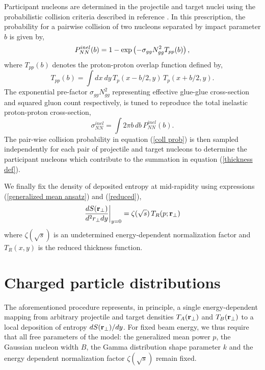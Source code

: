 \documentclass[aps,prl,reprint,amsmath,nofootinbib]{revtex4-1}
\begin{document}
Participant nucleons are determined in the projectile and target nuclei using the probabilistic collision criteria described in reference \cite{proton-proton}. In this prescription, the 
probability for a pairwise collision of two nucleons separated by impact parameter $b$ is given by,
\begin{equation}
  \label{coll prob}
  P^{inel}_{NN}(b) = 1 - \exp \left(-\sigma_{gg} N_{gg}^2 T_{pp}(b) \right), \\[1ex]
\end{equation}
where $T_{pp}(b)$ denotes the proton-proton overlap function defined by,
\begin{equation}
 T_{pp}(b) = \int dx~dy \,T_p(x-b/2,y) \,T_p(x+b/2,y).
\end{equation}
The exponential pre-factor $\sigma_{gg} N_{gg}^2$ representing effective glue-glue cross-section and squared gluon count respectively, is tuned to reproduce the total 
inelastic proton-proton cross-section,
\begin{equation}
  \sigma^{inel}_{NN} = \int 2 \pi b \,db \, P_{NN}^{inel}(b).
\end{equation}
The pair-wise collision probability in equation (\ref{coll prob}) is then sampled independently for each pair of projectile and target nucleons to determine the participant nucleons 
which contribute to the summation in equation (\ref{thickness def}).

We finally fix the density of deposited entropy at mid-rapidity using expressions (\ref{generalized mean ansatz}) and (\ref{reduced}),
\begin{equation}
 \label{entropy deposition}
 \frac{dS({\bf r}_\perp)}{d^2r_\perp dy} \biggr \rvert_{y=0} = \zeta(\sqrt{s})\, T_R(p;{\bf r}_\perp)
\end{equation}
where $\zeta(\sqrt{s})$ is an undetermined energy-dependent normalization factor and $T_R(x,y)$ is the reduced thickness function.

\section{Charged particle distributions}

The aforementioned procedure represents, in principle, a single energy-dependent mapping from arbitrary projectile and target densities $T_A ({\bf r}_\perp)$ and 
$T_B({\bf r}_\perp)$ to a local deposition of entropy $dS({\bf r}_\perp)/dy$. For fixed beam energy, we thus require that all free parameters of the model: 
the generalized mean power $p$, the Gaussian nucleon width $B$, the Gamma distribution shape parameter $k$ and the energy dependent normalization factor 
$\zeta(\sqrt{s})$ remain fixed. 
\end{document}
